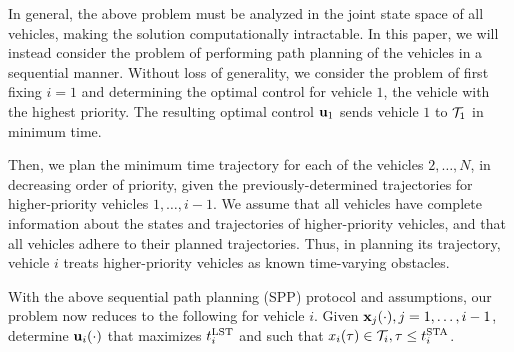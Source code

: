 In general, the above problem must be analyzed in the joint state space of all vehicles, making the solution computationally intractable. In this paper, we will instead consider the problem of performing path planning of the vehicles in a sequential manner. Without loss of generality, we consider the problem of first fixing $i=1$ and determining the optimal control for vehicle $1$, the vehicle with the highest priority. The resulting optimal control $\mathbf{u}_1$ sends vehicle $1$ to $\mathcal{T}_1$ in minimum time. 

Then, we plan the minimum time trajectory for each of the vehicles $2,\ldots,N$, in decreasing order of priority, given the previously-determined trajectories for higher-priority vehicles $1,\ldots,i-1$. We assume that all vehicles have complete information about the states and trajectories of higher-priority vehicles, and that all vehicles adhere to their planned trajectories. Thus, in planning its trajectory, vehicle $i$ treats higher-priority vehicles as known time-varying obstacles. 

With the above sequential path planning (SPP) protocol and assumptions, our problem now reduces to the following for vehicle $i$. Given $\mathbf{x}_j(\cdot), j=1,\ldots,i-1$, determine $\mathbf{u}_i(\cdot)$ that maximizes $t^{\text{LST}}_i$ and such that $x_i(\tau) \in \mathcal{T}_i, \tau\le t^{\text{STA}}_i$.